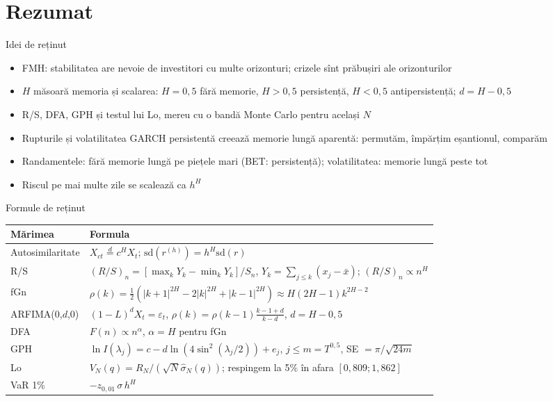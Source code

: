 \section{Rezumat}

\begin{frame}{Idei de reținut}
\itemsize{\small}
\begin{itemize}
    \item FMH: stabilitatea are nevoie de investitori cu multe orizonturi; crizele sînt prăbușiri ale orizonturilor
    \item $H$ măsoară memoria și scalarea: $H = 0{,}5$ fără memorie, $H > 0{,}5$ persistență, $H < 0{,}5$ antipersistență; $d = H - 0{,}5$
    \item R/S, DFA, GPH și testul lui Lo, mereu cu o bandă Monte Carlo pentru același $N$
    \item Rupturile și volatilitatea GARCH persistentă creează memorie lungă aparentă: permutăm, împărțim eșantionul, comparăm
    \item Randamentele: fără memorie lungă pe piețele mari (BET: persistență); volatilitatea: memorie lungă peste tot
    \item Riscul pe mai multe zile se scalează ca $h^H$
\end{itemize}
\end{frame}

\begin{frame}{Formule de reținut}
\itemsize{\small}
{\renewcommand{\arraystretch}{1.45}\begin{center}
\small
\begin{tabular}{ll}
\toprule
\textbf{Mărimea} & \textbf{Formula} \\
\midrule
Autosimilaritate & $X_{ct} \overset{d}{=} c^H X_t$; \quad $\mathrm{sd}(r^{(h)}) = h^H \mathrm{sd}(r)$ \\
R/S & $(R/S)_n = \left[\max_k Y_k - \min_k Y_k\right]/S_n$, \quad $Y_k = \sum_{j \le k}(x_j - \bar x)$; \quad $(R/S)_n \propto n^H$ \\
fGn & $\rho(k) = \tfrac12(|k + 1|^{2H} - 2|k|^{2H} + |k - 1|^{2H}) \approx H(2H - 1)k^{2H - 2}$ \\
ARFIMA(0,$d$,0) & $(1 - L)^d X_t = \varepsilon_t$, \quad $\rho(k) = \rho(k - 1)\frac{k - 1 + d}{k - d}$, \quad $d = H - 0{,}5$ \\
DFA & $F(n) \propto n^{\alpha}$, \quad $\alpha = H$ pentru fGn \\
GPH & $\ln I(\lambda_j) = c - d\ln(4\sin^2(\lambda_j/2)) + e_j$, \quad $j \le m = T^{0{,}5}$, \quad SE $= \pi/\sqrt{24m}$ \\
Lo & $V_N(q) = R_N/(\sqrt{N}\hat\sigma_N(q))$; respingem la 5\% în afara $[0{,}809; 1{,}862]$ \\
VaR 1\% & $-z_{0{,}01}\,\sigma\,h^H$ \\
\bottomrule
\end{tabular}
\end{center}
}
\end{frame}


